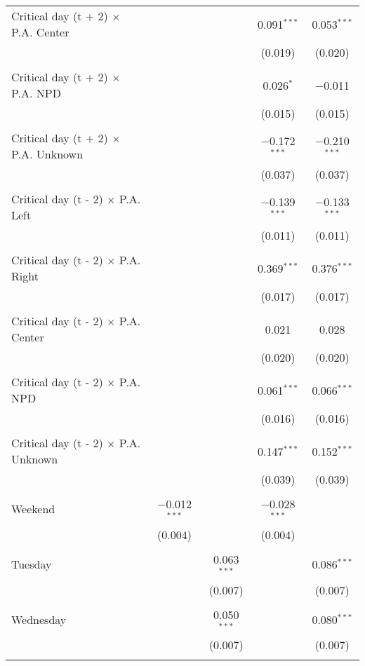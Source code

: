 \documentclass[
]{article}
\begin{document}
\begin{table}[!htbp]
{\begin{tabular}{@{\extracolsep{5pt}}lcccc}
 Critical day (t + 2) $\times$ P.A. Center &  &  & 0.091$^{***}$ & 0.053$^{***}$ \\ 
  &  &  & (0.019) & (0.020) \\ 
  & & & & \\ 
 Critical day (t + 2) $\times$ P.A. NPD &  &  & 0.026$^{*}$ & $-$0.011 \\ 
  &  &  & (0.015) & (0.015) \\ 
  & & & & \\ 
 Critical day (t + 2) $\times$ P.A. Unknown &  &  & $-$0.172$^{***}$ & $-$0.210$^{***}$ \\ 
  &  &  & (0.037) & (0.037) \\ 
  & & & & \\ 
 Critical day (t - 2) $\times$ P.A. Left &  &  & $-$0.139$^{***}$ & $-$0.133$^{***}$ \\ 
  &  &  & (0.011) & (0.011) \\ 
  & & & & \\ 
 Critical day (t - 2) $\times$ P.A. Right &  &  & 0.369$^{***}$ & 0.376$^{***}$ \\ 
  &  &  & (0.017) & (0.017) \\ 
  & & & & \\ 
 Critical day (t - 2) $\times$ P.A. Center &  &  & 0.021 & 0.028 \\ 
  &  &  & (0.020) & (0.020) \\ 
  & & & & \\ 
 Critical day (t - 2) $\times$ P.A. NPD &  &  & 0.061$^{***}$ & 0.066$^{***}$ \\ 
  &  &  & (0.016) & (0.016) \\ 
  & & & & \\ 
 Critical day (t - 2) $\times$ P.A. Unknown &  &  & 0.147$^{***}$ & 0.152$^{***}$ \\ 
  &  &  & (0.039) & (0.039) \\ 
  & & & & \\ 
 Weekend & $-$0.012$^{***}$ &  & $-$0.028$^{***}$ &  \\ 
  & (0.004) &  & (0.004) &  \\ 
  & & & & \\ 
 Tuesday &  & 0.063$^{***}$ &  & 0.086$^{***}$ \\ 
  &  & (0.007) &  & (0.007) \\ 
  & & & & \\ 
 Wednesday &  & 0.050$^{***}$ &  & 0.080$^{***}$ \\ 
  &  & (0.007) &  & (0.007) \\ 
  & & & & \\ 

\end{tabular}}
\end{table}
\end{document}
